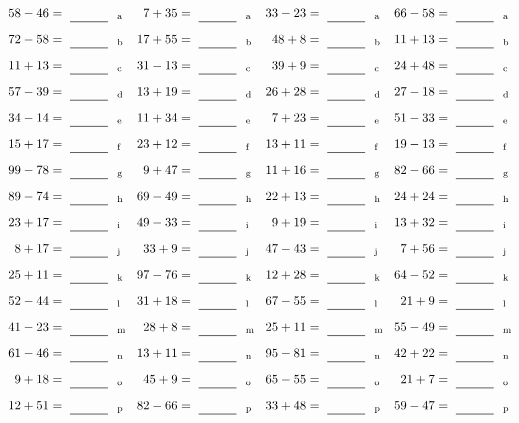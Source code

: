\documentclass
[
  draft    = true,
  fontsize = 11pt,
  parskip  = half-
]
{scrartcl}
\begin{document}
\clearpage
\begin{align*}
    \pline{58-46}&=\rline{a}
  & \pline{7+35}&=\rline{a}
  & \pline{33-23}&=\rline{a}
  & \pline{66-58}&=\rline{a} \\[1ex]
    \pline{72-58}&=\rline{b}
  & \pline{17+55}&=\rline{b}
  & \pline{48+8}&=\rline{b}
  & \pline{11+13}&=\rline{b} \\[1ex]
    \pline{11+13}&=\rline{c}
  & \pline{31-13}&=\rline{c}
  & \pline{39+9}&=\rline{c}
  & \pline{24+48}&=\rline{c} \\[1ex]
    \pline{57-39}&=\rline{d}
  & \pline{13+19}&=\rline{d}
  & \pline{26+28}&=\rline{d}
  & \pline{27-18}&=\rline{d} \\[1ex]
    \pline{34-14}&=\rline{e}
  & \pline{11+34}&=\rline{e}
  & \pline{7+23}&=\rline{e}
  & \pline{51-33}&=\rline{e} \\[1ex]
    \pline{15+17}&=\rline{f}
  & \pline{23+12}&=\rline{f}
  & \pline{13+11}&=\rline{f}
  & \pline{19-13}&=\rline{f} \\[1ex]
    \pline{99-78}&=\rline{g}
  & \pline{9+47}&=\rline{g}
  & \pline{11+16}&=\rline{g}
  & \pline{82-66}&=\rline{g} \\[1ex]
    \pline{89-74}&=\rline{h}
  & \pline{69-49}&=\rline{h}
  & \pline{22+13}&=\rline{h}
  & \pline{24+24}&=\rline{h} \\[1ex]
    \pline{23+17}&=\rline{i}
  & \pline{49-33}&=\rline{i}
  & \pline{9+19}&=\rline{i}
  & \pline{13+32}&=\rline{i} \\[1ex]
    \pline{8+17}&=\rline{j}
  & \pline{33+9}&=\rline{j}
  & \pline{47-43}&=\rline{j}
  & \pline{7+56}&=\rline{j} \\[1ex]
    \pline{25+11}&=\rline{k}
  & \pline{97-76}&=\rline{k}
  & \pline{12+28}&=\rline{k}
  & \pline{64-52}&=\rline{k} \\[1ex]
    \pline{52-44}&=\rline{l}
  & \pline{31+18}&=\rline{l}
  & \pline{67-55}&=\rline{l}
  & \pline{21+9}&=\rline{l} \\[1ex]
    \pline{41-23}&=\rline{m}
  & \pline{28+8}&=\rline{m}
  & \pline{25+11}&=\rline{m}
  & \pline{55-49}&=\rline{m} \\[1ex]
    \pline{61-46}&=\rline{n}
  & \pline{13+11}&=\rline{n}
  & \pline{95-81}&=\rline{n}
  & \pline{42+22}&=\rline{n} \\[1ex]
    \pline{9+18}&=\rline{o}
  & \pline{45+9}&=\rline{o}
  & \pline{65-55}&=\rline{o}
  & \pline{21+7}&=\rline{o} \\[1ex]
    \pline{12+51}&=\rline{p}
  & \pline{82-66}&=\rline{p}
  & \pline{33+48}&=\rline{p}
  & \pline{59-47}&=\rline{p}
\end{align*}
\end{document}
